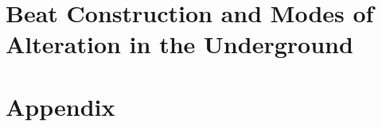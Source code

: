 \documentclass[12pt]{report}
\begin{document}
\chapter[Beat Construction and Alteration]{Beat Construction and Modes of Alteration in the Underground}


%

%

%


\printbibliography
{}
\nocite{*}

\chapter*{Appendix}

\end{document}
